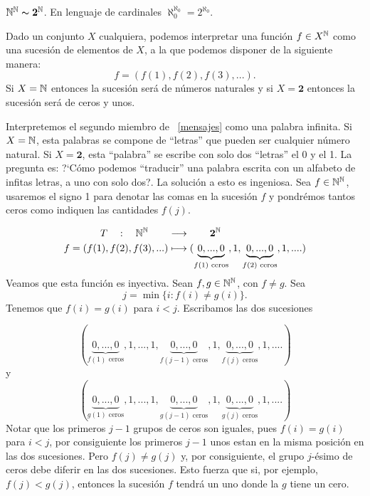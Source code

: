 \begin{proposicion}{} $\mathbb{N}^{\mathbb{N}}\thicksim\mathbf{2}^{\mathbb{N}}$. En lenguaje de cardinales  $\aleph_0^{\aleph_0}=2^{\aleph_0}$.
\end{proposicion}

\begin{demo} Dado un conjunto $X$ cualquiera, podemos interpretar una
función $f\in X^{\mathbb{N}}$ como una sucesión de elementos de $X$,
a la que podemos disponer de la siguiente manera:
\begin{equation}\label{mensajes}
     f=(f(1),f(2),f(3),...).
\end{equation}
Si $X=\mathbb{N}$ entonces la sucesión será de números naturales y
si $X=\mathbf{2}$ entonces la sucesión será de ceros y unos.

Interpretemos el segundo miembro de ~\eqref{mensajes}  como una
palabra infinita. Si $X=\mathbb{N}$, esta palabras se compone de
``letras'' que pueden ser cualquier número natural. Si
$X=\mathbf{2}$, esta ``palabra'' se escribe con solo dos
``letras'' el 0 y el 1. La pregunta es: ?`Cómo podemos
``traducir'' una palabra escrita con un alfabeto de infitas
letras, a uno con solo dos?. La solución a esto es ingeniosa.
Sea $f\in\mathbb{N}^{\mathbb{N}}$, usaremos el signo 1 para denotar las comas en
la sucesión $f$ y pondrémos tantos ceros como indiquen las
cantidades $f(j)$.


\[
  \begin{split}
         T\quad:\quad\mathbb{N}^{\mathbb{N}}\quad\quad &\longrightarrow\quad\quad\mathbf{2}^{\mathbb{N}}\\
         f=(f(1),f(2),f(3),...)&\longmapsto
          (\underbrace{0,...,0}_{f(1)\,\,\text{ceros}},1,
          \underbrace{0,...,0}_{f(2)\,\,\text{ceros}},1,....)\\
 \end{split}
\]
Veamos que esta función es inyectiva. Sean $f,g\in\mathbb{N}^{\mathbb{N}}$,
con  $f\neq g$. Sea
\[j=\min\{i:f(i)\neq g(i)\}.\]
Tenemos que $f(i)=g(i)$ para $i<j$. Escribamos las dos sucesiones

\[   (\underbrace{0,...,0}_{f(1)\,\,\text{ceros}},1,
         ...,1,\underbrace{0,...,0}_{f(j-1)
          \,\,\text{ceros}},1, \underbrace{0,...,0}_{f(j)\,\,\text{ceros}},1,....)
\]
y
\[   (\underbrace{0,...,0}_{g(1)\,\,\text{ceros}},1,
         ...,1,\underbrace{0,...,0}_{g(j-1)
          \,\,\text{ceros}},1, \underbrace{0,...,0}_{g(j)\,\,\text{ceros}},1,....)
\]
Notar que los primeros $j-1$ grupos de ceros son iguales, pues
$f(i)=g(i)$ para $i<j$, por consiguiente los primeros $j-1$ unos
estan en la misma posición en las dos sucesiones. Pero $f(j)\neq
g(j)$ y, por consiguiente, el grupo $j$-ésimo de ceros debe
diferir en las dos sucesiones. Esto fuerza que si, por ejemplo,
$f(j)<g(j)$, entonces la sucesión $f$ tendrá un uno donde la
$g$ tiene un cero.


\end{demo}
